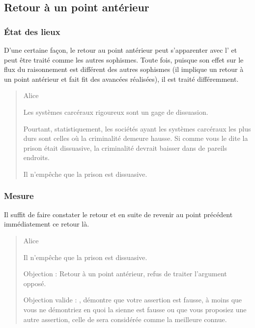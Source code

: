 \subsection{Retour à un point antérieur}
\subsubsection{État des lieux}
D’une certaine façon, le retour au point antérieur peut s’apparenter avec l’ et peut être traité comme les autres sophismes. Toute fois, puisque son effet sur le flux du raisonnement est différent des autres sophismes (il implique un retour à un point antérieur et fait fit des avancées réalisées), il est traité différemment.

\begin{quote}
  \begin{drama}{0cm}{0cm}{Alice}

    \Aspeaks       Les systèmes carcéraux rigoureux sont un gage de dissuasion.

    \Bspeaks       Pourtant, statistiquement, les sociétés ayant les systèmes carcéraux les plus durs sont celles où la criminalité demeure hausse. Si comme vous le dite la prison était dissuasive, la criminalité devrait baisser dans de pareils endroits.

    \Aspeaks       Il n’empêche que la prison est dissuasive.

  \end{drama}
\end{quote}

\subsubsection{Mesure}
Il suffit de faire constater le retour et en suite de revenir au point précédent immédiatement ce retour là.
\begin{quote}
  \begin{drama}{0cm}{0cm}{Alice}

    \Aspeaks       Il n’empêche que la prison est dissuasive.

    \Bspeaks       Objection : Retour à un point antérieur, refus de traiter l’argument opposé.

    \Arbitrespeaks Objection valide : \A, \B démontre que votre assertion est fausse, à moins que vous ne démontriez en quoi la sienne est fausse ou que vous proposiez une autre assertion, celle de \B sera considérée comme la meilleure connue.

  \end{drama}
\end{quote}

